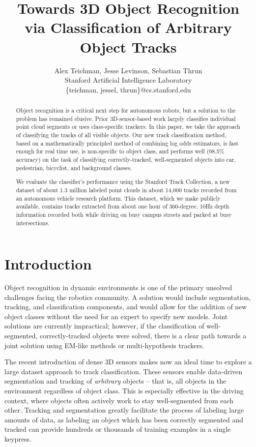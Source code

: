 \documentclass[letterpaper, 10 pt, conference]{ieeeconf}  %
\title{\LARGE \bf
Towards 3D Object Recognition \\
via Classification of Arbitrary Object Tracks
}
\author{ Alex Teichman, Jesse Levinson, Sebastian Thrun \\
  Stanford Artificial Intelligence Laboratory\\
  \{teichman, jessel, thrun\}@cs.stanford.edu
  }
\begin{document}
\maketitle
\thispagestyle{empty}
\pagestyle{empty}


\begin{abstract}
Object recognition is a critical next step for autonomous robots, but a solution to the problem has remained elusive. Prior 3D-sensor-based work largely classifies individual point cloud segments or uses class-specific trackers. In this paper, we take the approach of classifying the tracks of all visible objects. Our new track classification method, based on a mathematically principled method of combining log odds estimators, is fast enough for real time use, is non-specific to object class, and performs well (98.5\% accuracy) on the task of classifying correctly-tracked, well-segmented objects into car, pedestrian, bicyclist, and background classes.

We evaluate the classifier's performance using the Stanford Track Collection, a new dataset of about 1.3 million labeled point clouds in about 14,000 tracks recorded from an autonomous vehicle research platform. This dataset, which we make publicly available, contains tracks extracted from about one hour of 360-degree, 10Hz depth information recorded both while driving on busy campus streets and parked at busy intersections.
  
\end{abstract}

\IEEEpeerreviewmaketitle



\section{Introduction}

Object recognition in dynamic environments is one of the primary unsolved challenges facing the robotics community.  A solution would include segmentation, tracking, and classification components, and would allow for the addition of new object classes without the need for an expert to specify new models.  Joint solutions are currently impractical; however, if the classification of well-segmented, correctly-tracked objects were solved, there is a clear path towards a joint solution using EM-like methods or multi-hypothesis trackers.

The recent introduction of dense 3D sensors makes now an ideal time to explore a large dataset approach to track classification.  These sensors enable data-driven segmentation and tracking of \textit{arbitrary} objects -- that is, all objects in the environment regardless of object class.  This is especially effective in the driving context, where objects often actively work to stay well-segmented from each other.  Tracking and segmentation greatly facilitate the process of labeling large amounts of data, as labeling an object which has been correctly segmented and tracked can provide hundreds or thousands of training examples in a single keypress.
\end{document}
